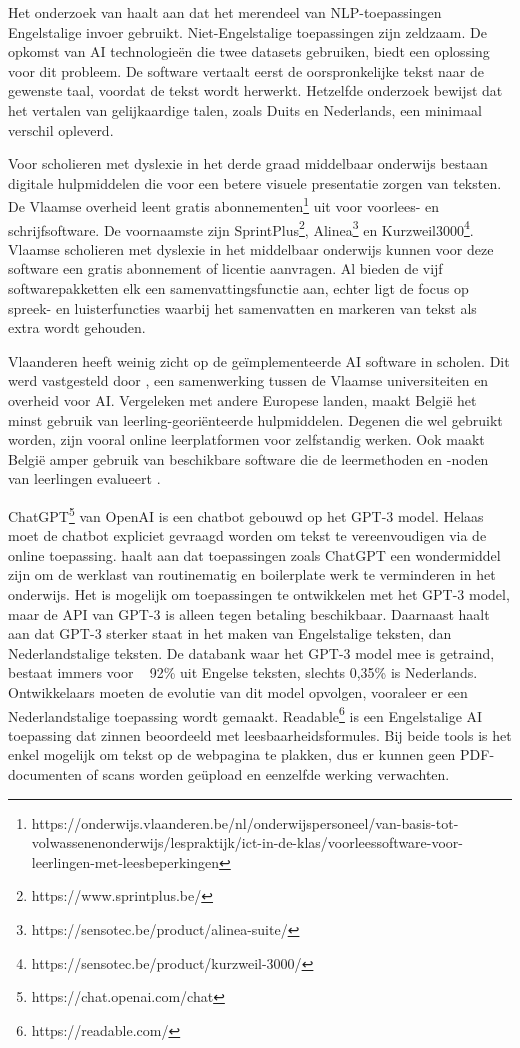 Het onderzoek van \textcite{Sciforce2020} haalt aan dat het merendeel van NLP-toepassingen Engelstalige invoer gebruikt. Niet-Engelstalige toepassingen zijn zeldzaam. De opkomst van AI technologieën die twee datasets gebruiken, biedt een oplossing voor dit probleem. De software vertaalt eerst de oorspronkelijke tekst naar de gewenste taal, voordat de tekst wordt herwerkt. Hetzelfde onderzoek bewijst dat het vertalen van gelijkaardige talen, zoals Duits en Nederlands, een minimaal verschil opleverd.

Voor scholieren met dyslexie in het derde graad middelbaar onderwijs bestaan digitale hulpmiddelen die voor een betere visuele presentatie zorgen van teksten. De Vlaamse overheid leent gratis abonnementen\footnote{https://onderwijs.vlaanderen.be/nl/onderwijspersoneel/van-basis-tot-volwassenenonderwijs/lespraktijk/ict-in-de-klas/voorleessoftware-voor-leerlingen-met-leesbeperkingen} uit voor voorlees- en schrijfsoftware. De voornaamste zijn SprintPlus\footnote{https://www.sprintplus.be/}, Alinea\footnote{https://sensotec.be/product/alinea-suite/} en Kurzweil3000\footnote{https://sensotec.be/product/kurzweil-3000/}. Vlaamse scholieren met dyslexie in het middelbaar onderwijs kunnen voor deze software een gratis abonnement of licentie aanvragen. Al bieden de vijf softwarepakketten elk een samenvattingsfunctie aan, echter ligt de focus op spreek- en luisterfuncties waarbij het samenvatten en markeren van tekst als extra wordt gehouden.

Vlaanderen heeft weinig zicht op de geïmplementeerde AI software in scholen. Dit werd vastgesteld door \autocite{Martens2021}, een samenwerking tussen de Vlaamse universiteiten en overheid voor AI. Vergeleken met andere Europese landen, maakt België het minst gebruik van leerling-georiënteerde hulpmiddelen. Degenen die wel gebruikt worden, zijn vooral online leerplatformen voor zelfstandig werken. Ook maakt België amper gebruik van beschikbare software die de leermethoden en -noden van leerlingen evalueert \autocite{Martens2021a}. 

ChatGPT\footnote{https://chat.openai.com/chat} van OpenAI is een chatbot gebouwd op het GPT-3 model. Helaas moet de chatbot expliciet gevraagd worden om tekst te vereenvoudigen via de online toepassing. \textcite{Verhoeven2023} haalt aan dat toepassingen zoals ChatGPT een wondermiddel zijn om de werklast van routinematig en boilerplate werk te verminderen in het onderwijs. Het is mogelijk om toepassingen te ontwikkelen met het GPT-3 model, maar de API van GPT-3 is alleen tegen betaling beschikbaar. Daarnaast haalt \textcite{Deckmyn2021} aan dat GPT-3 sterker staat in het maken van Engelstalige teksten, dan Nederlandstalige teksten. De databank waar het GPT-3 model mee is getraind, bestaat immers voor ~ 92\% uit Engelse teksten, slechts 0,35\% is Nederlands. Ontwikkelaars moeten de evolutie van dit model opvolgen, vooraleer er een Nederlandstalige toepassing wordt gemaakt. Readable\footnote{https://readable.com/} is een Engelstalige AI toepassing dat zinnen beoordeeld met leesbaarheidsformules. Bij beide tools is het enkel mogelijk om tekst op de webpagina te plakken, dus er kunnen geen PDF-documenten of scans worden geüpload en eenzelfde werking verwachten.

